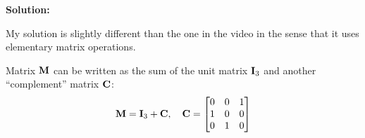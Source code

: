 \documentclass[a4paper]{article}
\begin{document}


%







\textbf{Solution:}

My solution is slightly different than the one in the video in the sense that it uses elementary matrix operations.

Matrix $\textbf{M}$ can be written as the sum of the unit matrix $\textbf{I}_3$ and another ``complement'' matrix $\textbf{C}$:
\begin{equation*}
    \textbf{M} = \textbf{I}_3 + \textbf{C}, \quad \textbf{C} = 
    \begin{bmatrix}
        0 & 0 & 1\\
        1 & 0 & 0\\
        0 & 1 & 0
    \end{bmatrix}
\end{equation*}
\end{document}
